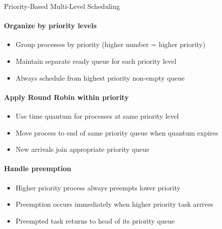 \begin{KR}{Priority-Based Multi-Level Scheduling}
    \paragraph{Organize by priority levels}
    \begin{itemize}
        \item Group processes by priority (higher number = higher priority)
        \item Maintain separate ready queue for each priority level
        \item Always schedule from highest priority non-empty queue
    \end{itemize}
    
    \paragraph{Apply Round Robin within priority}
    \begin{itemize}
        \item Use time quantum for processes at same priority level
        \item Move process to end of same priority queue when quantum expires
        \item New arrivals join appropriate priority queue
    \end{itemize}
    
    \paragraph{Handle preemption}
    \begin{itemize}
        \item Higher priority process always preempts lower priority
        \item Preemption occurs immediately when higher priority task arrives
        \item Preempted task returns to head of its priority queue
    \end{itemize}
\end{KR}

